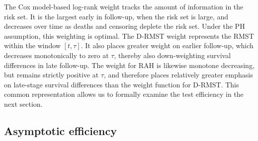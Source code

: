 \documentclass[12pt]{article}
\begin{document}
The Cox model-based log-rank weight tracks the amount of information in the risk set. It is the largest early in follow-up, when the risk set is large, and decreases over time as deaths and censoring deplete the risk set. Under the PH assumption, this weighting is optimal. The D-RMST weight represents the RMST within the window \([t, \tau]\). It also places greater weight on earlier follow-up, which decreases monotonically to zero at \(\tau\), thereby also down-weighting survival differences in late follow-up. The weight for RAH is likewise monotone decreasing, but remains strictly positive at \(\tau\), and therefore places relatively greater emphasis on late-stage survival differences than the weight function for D-RMST. This common representation allows us to formally examine the test efficiency in the next section.





\subsection{Asymptotic efficiency}
\label{sec:efficiency}
\end{document}
